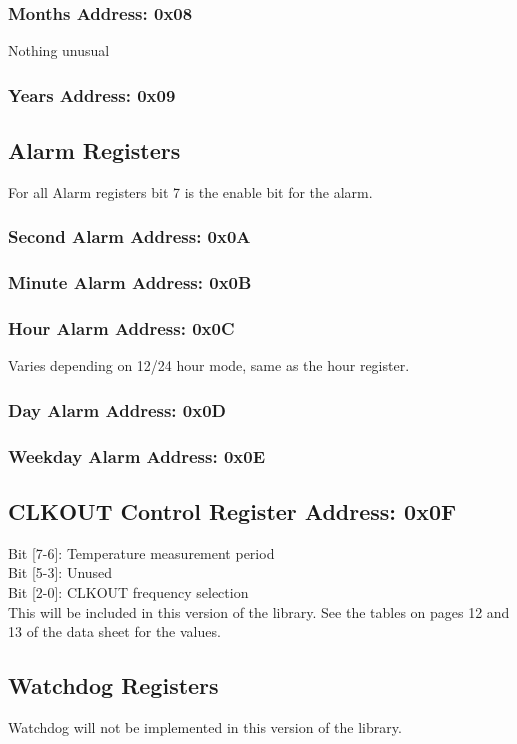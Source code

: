 \documentclass[letterpaper,11pt]{article}
\newcommand{\address}[1]
{\textbf{Address: 0x#1}}
\begin{document}
		\subsubsection{Months \address{08}}
			Nothing unusual
		\subsubsection{Years \address{09}}
	\subsection{Alarm Registers}
		For all Alarm registers bit 7 is the enable bit for the alarm.\\
		\subsubsection{Second Alarm \address{0A}}
		\subsubsection{Minute Alarm \address{0B}}
		\subsubsection{Hour Alarm \address{0C}}
			Varies depending on 12/24 hour mode, same as the hour register.
		\subsubsection{Day Alarm \address{0D}}
		\subsubsection{Weekday Alarm \address{0E}}
	\subsection{CLKOUT Control Register \address{0F}}
		Bit [7-6]: Temperature measurement period\\
		Bit [5-3]: Unused\\
		Bit [2-0]: CLKOUT frequency selection\\
		This will be included in this version of the library. See the tables on pages 12 and 13 of the data sheet for the values.
	\subsection{Watchdog Registers}
		Watchdog will not be implemented in this version of the library.
\end{document}
